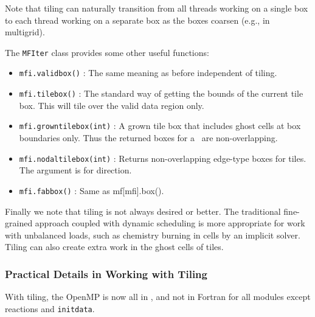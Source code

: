Note that tiling can naturally transition from all threads working
on a single box to each thread working on a separate box as the boxes
coarsen (e.g., in multigrid).

The {\tt MFIter} class provides some other useful functions:
\begin{itemize}
  \item {\tt mfi.validbox()} : The same meaning as before independent of tiling.

  \item {\tt mfi.tilebox()} : The standard way of getting the bounds of the 
    current tile box.  This will tile over the valid data region only.

  \item {\tt mfi.growntilebox(int)} : A grown tile box that includes
    ghost cells at box boundaries only.  Thus the returned boxes for a
    \farraybox\ are non-overlapping.

  \item {\tt mfi.nodaltilebox(int)} : Returns non-overlapping
    edge-type boxes for tiles.  The argument is for direction.

  \item {\tt mfi.fabbox()}  : Same as mf[mfi].box().
\end{itemize}

Finally we note that tiling is not always desired or better.  The
traditional fine-grained approach coupled with dynamic scheduling is
more appropriate for work with unbalanced loads, such as chemistry
burning in cells by an implicit solver.  Tiling can also create extra
work in the ghost cells of tiles.


\subsubsection{Practical Details in Working with Tiling}

With tiling, the OpenMP is now all in \cpp, and not in Fortran for all
modules except reactions and {\tt initdata}.  

